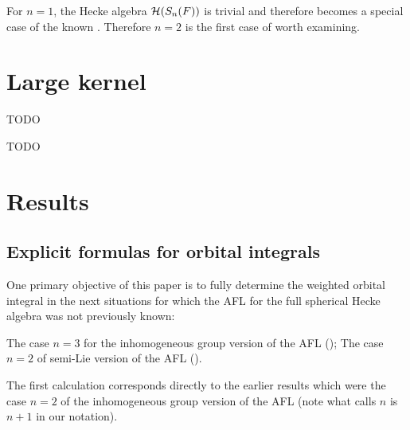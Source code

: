 \begin{remark}
  For $n = 1$, the Hecke algebra $\mathcal H(S_n(F))$ is trivial
  and therefore 
  becomes a special case of the known \cite{ref:liuFJ}.
  Therefore $n=2$ is the first case of  worth examining.
\end{remark}

\section{Large kernel}
\label{sec:intro_large_kernel}

\begin{conjecture}
  TODO
  \label{conj:large_kernel_group}
\end{conjecture}

\begin{conjecture}
  TODO
  \label{conj:large_kernel_semilie}
\end{conjecture}


\section{Results}
\subsection{Explicit formulas for orbital integrals}
One primary objective of this paper is to fully determine the weighted orbital integral
in the next situations for which the AFL for the full spherical Hecke algebra
was not previously known:
\begin{itemize}
  \ii The case $n = 3$ for the inhomogeneous group version of the AFL ();
  \ii The case $n = 2$ of semi-Lie version of the AFL ().
\end{itemize}
The first calculation corresponds directly to the earlier results
\cite[Lemma 7.1.1 and Proposition 7.3.2]{ref:AFLspherical}
which were the case $n = 2$ of the inhomogeneous group version of the AFL
(note what \cite{ref:AFLspherical} calls $n$ is $n+1$ in our notation).

